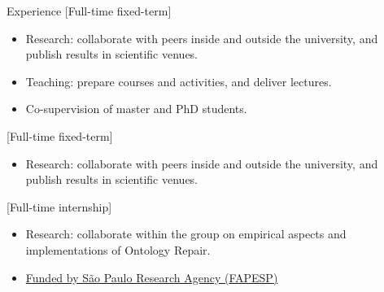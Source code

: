%

\begin{rSection}{Experience}
    [Full-time fixed-term]{%
        \begin{itemize}[nosep]
            \item Research: collaborate with peers inside and outside the university, and publish results in scientific venues.
            \item Teaching: prepare courses and activities, and deliver lectures.
            \item Co-supervision of master and PhD students.
        \end{itemize}%
    }

    [Full-time fixed-term]{%
        \begin{itemize}[nosep]
            \item Research: collaborate with peers inside and outside the university, and publish results in scientific venues.
        \end{itemize}%
    }

    [Full-time internship]{%
        \begin{itemize}[nosep]
            \item Research: collaborate within the group on empirical aspects and implementations of Ontology Repair.
            \item \href{https://bv.fapesp.br/en/bolsas/176114/improving-efficiency-of-belief-base-change-in-description-logics-with-modularity-in-ontologies/}{Funded by São Paulo Research Agency ({FAPESP})}
        \end{itemize}%
    }
\end{rSection}

